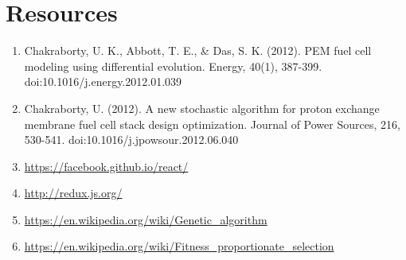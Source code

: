 \documentclass{article}
\begin{document}
\section{Resources}
\begin{enumerate}
    \item Chakraborty, U. K., Abbott, T. E., \& Das, S. K. (2012). PEM fuel cell modeling using differential evolution. Energy, 40(1), 387-399. doi:10.1016/j.energy.2012.01.039
    \item Chakraborty, U. (2012). A new stochastic algorithm for proton exchange membrane fuel cell stack design optimization. Journal of Power Sources, 216, 530-541. doi:10.1016/j.jpowsour.2012.06.040
    \item \url{https://facebook.github.io/react/}
    \item \url{http://redux.js.org/}
    \item \url{https://en.wikipedia.org/wiki/Genetic_algorithm}
    \item \url{https://en.wikipedia.org/wiki/Fitness_proportionate_selection}
\end{enumerate}
\end{document}
